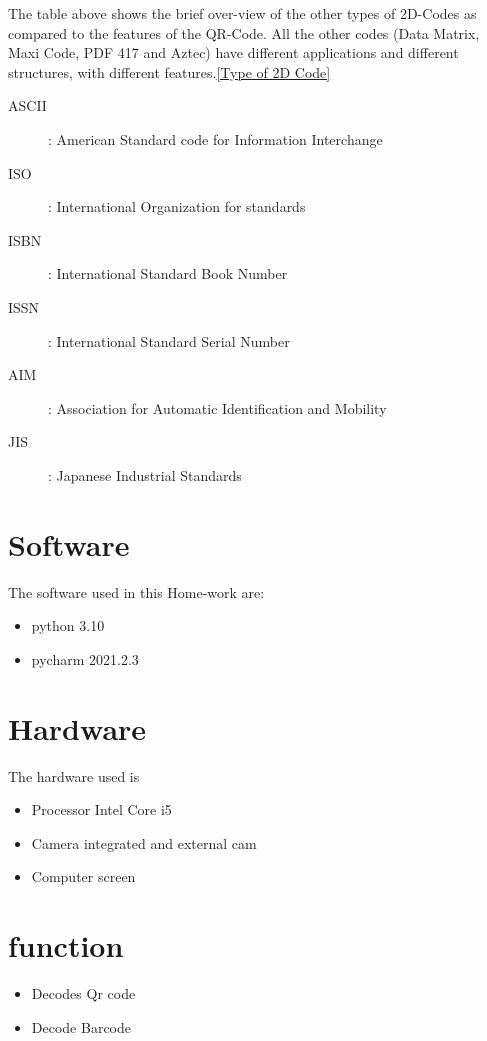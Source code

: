 The table above shows the brief over-view of the other types of 2D-Codes as compared to the features of the QR-Code. All the other codes (Data Matrix, Maxi Code, PDF 417 and Aztec) have different applications and different structures, with different features.\ref{Type of 2D Code}

\begin{description}
	\item[ASCII]: American Standard code for Information Interchange
	\item[ISO]: International Organization for standards
	\item[ISBN]: International Standard Book Number
	\item[ISSN]: International Standard Serial Number
	\item [AIM]: Association for Automatic Identification and Mobility
	\item[JIS]: Japanese Industrial Standards
\end{description}


\section{Software}

The software used in this Home-work are:

\begin{itemize}
    \item python 3.10
    \item pycharm 2021.2.3
\end{itemize} 

\section{Hardware}

The hardware used is 

\begin{itemize}
    \item Processor Intel Core i5
    \item Camera integrated and external cam
    \item Computer screen
\end{itemize}

\section{function}

\begin{itemize}
    \item Decodes Qr code 
    \item Decode Barcode
\end{itemize}

